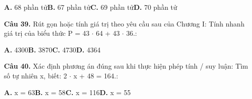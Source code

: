 \documentclass[11pt,a4paper]{article}
\begin{document}
\hspace*{1.5em}\textbf{A.} 68 phần tử\quad\quad \textbf{B.} 67 phần tử\quad\quad \textbf{C.} 69 phần tử\quad\quad \textbf{D.} 70 phần tử\par\vspace{2pt}
\textbf{\color{primary} Câu 39.} Rút gọn hoặc tính giá trị theo yêu cầu sau của Chương I: Tính nhanh giá trị của biểu thức P = 43 $\cdot$ 64 + 43 $\cdot$ 36.:\par
\hspace*{1.5em}\textbf{A.} 4300\quad\quad \textbf{B.} 3870\quad\quad \textbf{C.} 4730\quad\quad \textbf{D.} 4364\par\vspace{2pt}
\textbf{\color{primary} Câu 40.} Xác định phương án đúng sau khi thực hiện phép tính / suy luận: Tìm số tự nhiên x, biết: 2 $\cdot$ x + 48 = 164.:\par
\hspace*{1.5em}\textbf{A.} x = 63\quad\quad \textbf{B.} x = 58\quad\quad \textbf{C.} x = 116\quad\quad \textbf{D.} x = 55\par\vspace{2pt}
\end{document}
